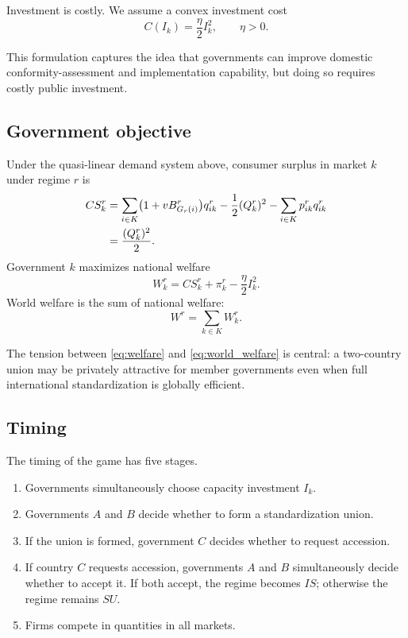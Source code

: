 Investment is costly. We assume a convex investment cost
\begin{equation}
C(I_k)=\frac{\eta}{2}I_k^2, \qquad \eta>0.
\label{eq:investment_cost}
\end{equation}

This formulation captures the idea that governments can improve domestic conformity-assessment and implementation capability, but doing so requires costly public investment.

\subsection{Government objective}

Under the quasi-linear demand system above, consumer surplus in market $k$
under regime $r$ is
\begin{align}
CS_k^r
&=
\sum_{i \in K} \bigl(1 + v B_{G_r(i)}^r\bigr) q_{ik}^r
-
\frac{1}{2}(Q_k^r)^2
-
\sum_{i \in K} p_{ik}^r q_{ik}^r \notag\\
&=
\frac{(Q_k^r)^2}{2}.
\label{eq:consumer_surplus}
\end{align}
Government $k$ maximizes national welfare
\begin{equation}
W_k^r = CS_k^r + \pi_k^r - \frac{\eta}{2}I_k^2.
\label{eq:welfare}
\end{equation}
World welfare is the sum of national welfare:
\begin{equation}
W^r = \sum_{k \in K} W_k^r.
\label{eq:world_welfare}
\end{equation}

The tension between \eqref{eq:welfare} and \eqref{eq:world_welfare} is central: a two-country union may be privately attractive for member governments even when full international standardization is globally efficient.

\subsection{Timing}

The timing of the game has five stages.

\begin{enumerate}
    \item[\textbf{Stage 0.}] Governments simultaneously choose capacity investment $I_k$.
    \item[\textbf{Stage 1.}] Governments $A$ and $B$ decide whether to form a standardization union.
    \item[\textbf{Stage 2.}] If the union is formed, government $C$ decides whether to request accession.
    \item[\textbf{Stage 3.}] If country $C$ requests accession, governments $A$ and $B$ simultaneously decide whether to accept it. If both accept, the regime becomes $IS$; otherwise the regime remains $SU$.
    \item[\textbf{Stage 4.}] Firms compete in quantities in all markets.
\end{enumerate}

